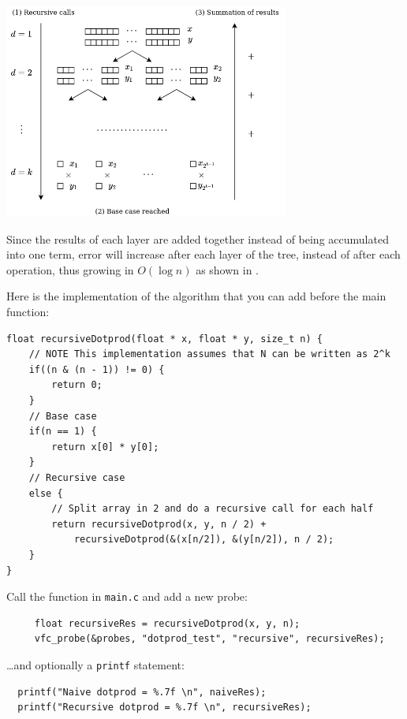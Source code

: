 \begin{center}
\includegraphics[width=0.7\textwidth]{images/recursive_dotprod.png}
\end{center}

Since the results of each layer are added together instead of being accumulated
into one term, error will increase after each layer of the tree, instead of
after each operation, thus growing in $O(\log n)$ as shown in \cite{higham}.

Here is the implementation of the algorithm that you can add before the main function:

\newpage

\begin{verbatim}
float recursiveDotprod(float * x, float * y, size_t n) {
	// NOTE This implementation assumes that N can be written as 2^k
	if((n & (n - 1)) != 0) {
		return 0;
	}
	// Base case
	if(n == 1) {
		return x[0] * y[0];
	}
	// Recursive case
	else {
		// Split array in 2 and do a recursive call for each half
		return recursiveDotprod(x, y, n / 2) +
			recursiveDotprod(&(x[n/2]), &(y[n/2]), n / 2);
	}
}
\end{verbatim}

Call the function in \texttt{main.c} and add a new probe:

\begin{verbatim}
     float recursiveRes = recursiveDotprod(x, y, n);
     vfc_probe(&probes, "dotprod_test", "recursive", recursiveRes);
\end{verbatim}

\dots and optionally a \texttt{printf} statement:

\begin{verbatim}
  printf("Naive dotprod = %.7f \n", naiveRes);
  printf("Recursive dotprod = %.7f \n", recursiveRes);
\end{verbatim}

